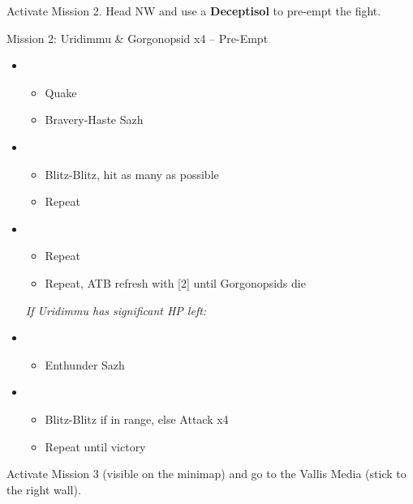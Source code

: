 Activate Mission 2.
Head NW and use a \textbf{Deceptisol} to pre-empt the fight.

\begin{battle}{Mission 2: Uridimmu \& Gorgonopsid x4 -- Pre-Empt}
	\begin{itemize}
		\item \third
			\begin{itemize}
				\item Quake
				\item Bravery-Haste Sazh
			\end{itemize}
		\item \second
			\begin{itemize}
				\item Blitz-Blitz, hit as many as possible
				\item Repeat
			\end{itemize}
		\item \first
			\begin{itemize}
				\item Repeat
				\item Repeat, ATB refresh with [2] until Gorgonopsids die
			\end{itemize}
		\textit{If Uridimmu has significant HP left:}
		\item \third
			\begin{itemize}
				\item Enthunder Sazh
			\end{itemize}
		\item \sixth
			\begin{itemize}
				\item Blitz-Blitz if in range, else Attack x4
				\item Repeat until victory
			\end{itemize}
	\end{itemize}
\end{battle}

Activate Mission 3 (visible on the minimap) and go to the Vallis Media (stick to the right wall).